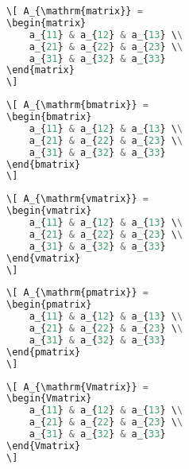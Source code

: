 
\begin{lstlisting}[language={python}]
\[ A_{\mathrm{matrix}} = 
\begin{matrix}
    a_{11} & a_{12} & a_{13} \\
    a_{21} & a_{22} & a_{23} \\
    a_{31} & a_{32} & a_{33}
\end{matrix}
\]
\end{lstlisting}

\begin{lstlisting}[language={python}]
\[ A_{\mathrm{bmatrix}} = 
\begin{bmatrix}
    a_{11} & a_{12} & a_{13} \\
    a_{21} & a_{22} & a_{23} \\
    a_{31} & a_{32} & a_{33}
\end{bmatrix}
\]
\end{lstlisting}

\begin{lstlisting}[language={python}]
\[ A_{\mathrm{vmatrix}} = 
\begin{vmatrix}
    a_{11} & a_{12} & a_{13} \\
    a_{21} & a_{22} & a_{23} \\
    a_{31} & a_{32} & a_{33}
\end{vmatrix}
\]
\end{lstlisting}

\begin{lstlisting}[language={python}]
\[ A_{\mathrm{pmatrix}} = 
\begin{pmatrix}
    a_{11} & a_{12} & a_{13} \\
    a_{21} & a_{22} & a_{23} \\
    a_{31} & a_{32} & a_{33}
\end{pmatrix}
\]
\end{lstlisting}

\begin{lstlisting}[language={python}]
\[ A_{\mathrm{Vmatrix}} = 
\begin{Vmatrix}
    a_{11} & a_{12} & a_{13} \\
    a_{21} & a_{22} & a_{23} \\
    a_{31} & a_{32} & a_{33}
\end{Vmatrix}
\]
\end{lstlisting}

